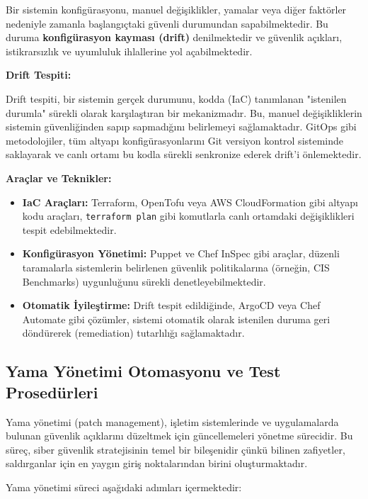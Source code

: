 Bir sistemin konfigürasyonu, manuel değişiklikler, yamalar veya diğer faktörler nedeniyle zamanla başlangıçtaki güvenli durumundan sapabilmektedir. Bu duruma \textbf{konfigürasyon kayması (drift)} denilmektedir ve güvenlik açıkları, istikrarsızlık ve uyumluluk ihlallerine yol açabilmektedir.

\textbf{Drift Tespiti:}

Drift tespiti, bir sistemin gerçek durumunu, kodda (IaC) tanımlanan "istenilen durumla" sürekli olarak karşılaştıran bir mekanizmadır. Bu, manuel değişikliklerin sistemin güvenliğinden sapıp sapmadığını belirlemeyi sağlamaktadır. GitOps gibi metodolojiler, tüm altyapı konfigürasyonlarını Git versiyon kontrol sisteminde saklayarak ve canlı ortamı bu kodla sürekli senkronize ederek drift'i önlemektedir.

\textbf{Araçlar ve Teknikler:}
\begin{itemize}
    \item \textbf{IaC Araçları:} Terraform, OpenTofu veya AWS CloudFormation gibi altyapı kodu araçları, \texttt{terraform plan} gibi komutlarla canlı ortamdaki değişiklikleri tespit edebilmektedir.
    \item \textbf{Konfigürasyon Yönetimi:} Puppet ve Chef InSpec gibi araçlar, düzenli taramalarla sistemlerin belirlenen güvenlik politikalarına (örneğin, CIS Benchmarks) uygunluğunu sürekli denetleyebilmektedir.
    \item \textbf{Otomatik İyileştirme:} Drift tespit edildiğinde, ArgoCD veya Chef Automate gibi çözümler, sistemi otomatik olarak istenilen duruma geri döndürerek (remediation) tutarlılığı sağlamaktadır.
\end{itemize}

\subsection{Yama Yönetimi Otomasyonu ve Test Prosedürleri}

Yama yönetimi (patch management), işletim sistemlerinde ve uygulamalarda bulunan güvenlik açıklarını düzeltmek için güncellemeleri yönetme sürecidir. Bu süreç, siber güvenlik stratejisinin temel bir bileşenidir çünkü bilinen zafiyetler, saldırganlar için en yaygın giriş noktalarından birini oluşturmaktadır.

Yama yönetimi süreci aşağıdaki adımları içermektedir:

